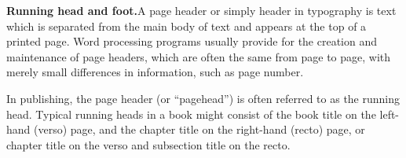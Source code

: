 \begin{multicols}{2}
\textbf{Running head and foot.}\quad A page header or simply header in typography is text which is separated from the main body of text and appears at the top of a printed page. Word processing programs usually provide for the creation and maintenance of page headers, which are often the same from page to page, with merely small differences in information, such as page number.

In publishing, the page header (or ``pagehead'') is often referred to as the running head. Typical running heads in a book might consist of the book title on the left-hand (verso) page, and the chapter title on the right-hand (recto) page, or chapter title on the verso and subsection title on the recto.
\end{multicols}


\begin{teX}
\if@twoside
  \def\ps@headings{%
      \let\@oddfoot\@empty\let\@evenfoot\@empty
      \def\@evenhead{\thepage\hfil\slshape\leftmark}%
      \def\@oddhead{{\slshape\rightmark}\hfil\thepage}%
      \let\@mkboth\markboth
  \def\chaptermark##1{%
      \markboth {\MakeUppercase{%
        \ifnum \c@secnumdepth >\m@ne
          \if@mainmatter
            \@chapapp\ \thechapter. \ %
          \fi
        \fi
        ##1}}{}}%
    \def\sectionmark##1{%
      \markright {\MakeUppercase{%
        \ifnum \c@secnumdepth >\z@
          \thesection. \ %
        \fi
        ##1}}}}
\else
  \def\ps@headings{%
    \let\@oddfoot\@empty
    \def\@oddhead{{\slshape\rightmark}\hfil\thepage}%
    \let\@mkboth\markboth
    \def\chaptermark##1{%
      \markright {\MakeUppercase{%
        \ifnum \c@secnumdepth >\m@ne
          \if@mainmatter
            \@chapapp\ \thechapter. \ %
          \fi
        \fi
        ##1}}}}
\fi
\def\ps@myheadings{%
    \let\@oddfoot\@empty\let\@evenfoot\@empty
    \def\@evenhead{\thepage\hfil\slshape\leftmark}%
    \def\@oddhead{{\slshape\rightmark}\hfil\thepage}%
    \let\@mkboth\@gobbletwo
    \let\chaptermark\@gobble
    \let\sectionmark\@gobble
    }
\end{teX}

